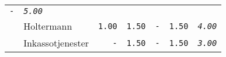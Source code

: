 \documentclass[11pt,A4paper,]{article}
\begin{document}
\begin{longtable}[]{@{}llrrrrr@{}}
\begin{minipage}[t]{0.14\columnwidth}
\texttt{-}\strut
\end{minipage} & \begin{minipage}[t]{0.14\columnwidth}\raggedleft\strut
\emph{\texttt{5.00}}\strut
\end{minipage}\tabularnewline
\begin{minipage}[t]{0.14\columnwidth}\raggedright\strut
\strut
\end{minipage} & \begin{minipage}[t]{0.14\columnwidth}\raggedright\strut
Holtermann\strut
\end{minipage} & \begin{minipage}[t]{0.14\columnwidth}\raggedleft\strut
\texttt{1.00}\strut
\end{minipage} & \begin{minipage}[t]{0.14\columnwidth}\raggedleft\strut
\texttt{1.50}\strut
\end{minipage} & \begin{minipage}[t]{0.14\columnwidth}\raggedleft\strut
\texttt{-}\strut
\end{minipage} & \begin{minipage}[t]{0.14\columnwidth}\raggedleft\strut
\texttt{1.50}\strut
\end{minipage} & \begin{minipage}[t]{0.14\columnwidth}\raggedleft\strut
\emph{\texttt{4.00}}\strut
\end{minipage}\tabularnewline
\begin{minipage}[t]{0.14\columnwidth}\raggedright\strut
\strut
\end{minipage} & \begin{minipage}[t]{0.14\columnwidth}\raggedright\strut
Inkassotjenester\strut
\end{minipage} & \begin{minipage}[t]{0.14\columnwidth}\raggedleft\strut
\texttt{-}\strut
\end{minipage} & \begin{minipage}[t]{0.14\columnwidth}\raggedleft\strut
\texttt{1.50}\strut
\end{minipage} & \begin{minipage}[t]{0.14\columnwidth}\raggedleft\strut
\texttt{-}\strut
\end{minipage} & \begin{minipage}[t]{0.14\columnwidth}\raggedleft\strut
\texttt{1.50}\strut
\end{minipage} & \begin{minipage}[t]{0.14\columnwidth}\raggedleft\strut
\emph{\texttt{3.00}}\strut

\end{minipage}
\end{longtable}
\end{document}
